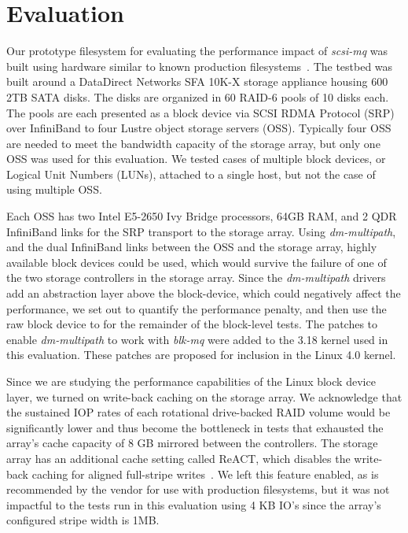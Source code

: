 \documentclass[conference]{IEEEtran}
\begin{document}
\section{Evaluation}
\label{sec:eval}
Our prototype filesystem for evaluating the performance impact of \emph{scsi-mq}
was built using hardware similar to known production filesystems~\cite{sc14-spider}. The testbed was built around
a DataDirect Networks SFA 10K-X storage appliance housing 600 2TB SATA disks. 
The disks are organized in 60 RAID-6 pools of 10 disks each. The pools
are each presented as a block device via SCSI RDMA Protocol (SRP) over InfiniBand to
four Lustre object storage servers (OSS). Typically four OSS  are needed to
meet the bandwidth capacity of the storage array, but only one OSS was used
for this evaluation. We tested cases of multiple block devices, or Logical Unit Numbers (LUNs),
attached to a single host, but not the case of using multiple OSS.

Each OSS has two
Intel E5-2650 Ivy Bridge processors, 64GB RAM, and 2 QDR InfiniBand links for the SRP
transport to the storage array. Using \emph{dm-multipath}, and the dual InfiniBand links between
the OSS and the storage array, highly available block devices could be used, which would
survive the failure of one of the two storage controllers in the storage array. Since the
\emph{dm-multipath} drivers add an abstraction layer above the block-device, which could
negatively affect the performance, we set out to quantify the performance penalty, and then
use the raw block device to for the remainder of the block-level tests. The patches to enable
\emph{dm-multipath} to work with \emph{blk-mq} were added to the 3.18 kernel used in this
evaluation. These patches are proposed for inclusion in the Linux 4.0 kernel.

Since we are studying the performance capabilities of the Linux block device layer, we
turned on write-back caching on the storage array. We acknowledge that the
sustained IOP rates of each rotational drive-backed RAID volume would be significantly
lower and thus become the bottleneck in tests that exhausted the array's cache capacity of 8 GB
mirrored between the controllers. The storage array has an additional cache setting called ReACT, which disables the write-back caching
for aligned full-stripe writes~\cite{ddn10k}. We left this feature enabled, as is recommended by the 
vendor for use with production filesystems, but it was not impactful to the tests run in this evaluation
using 4 KB IO's since the array's configured stripe width is 1MB.
\end{document}
